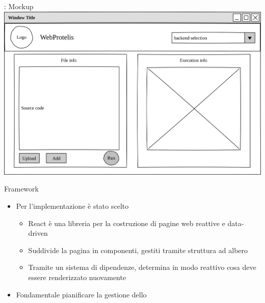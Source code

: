     \begin{frame}{\insertsectionhead}{\insertsubsectionhead{}: Mockup}
      \centering
      \includegraphics[width=.9\textwidth]{res/fig/gui-actual.png}
    \end{frame}

    \begin{frame}{\insertsectionhead}{\insertsubsectionhead}
      \begin{block}{Framework}
        \begin{itemize}
          \item
            Per l'implementazione è stato scelto 
            \begin{itemize}
              \item React è una libreria per la costruzione di pagine web reattive e data-driven
              \item Suddivide la pagina in componenti, gestiti tramite struttura ad albero
              \item Tramite un sistema di dipendenze, determina in modo reattivo cosa deve essere renderizzato nuovamente
            \end{itemize}
          \item Fondamentale pianificare la gestione dello 
        \end{itemize}
      \end{block}

    \end{frame}

